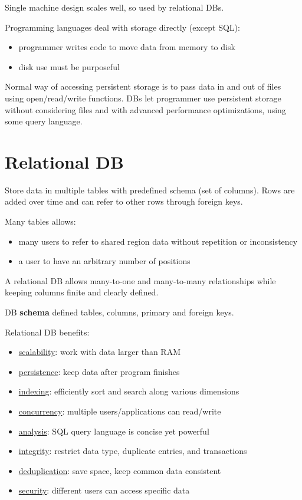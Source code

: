 \documentclass[11pt]{article}
\begin{document}
Single machine design scales well, so used by relational DBs.

Programming languages deal with storage directly (except SQL):
\begin{itemize}
\item programmer writes code to move data from memory to disk
\item disk use must be purposeful
\end{itemize}

Normal way of accessing persistent storage is to pass data in and out of files using open/read/write
functions.
DBs let programmer use persistent storage without considering files and with advanced performance
optimizations, using some query language.
\section{Relational DB}
\label{sec:orgc5113f4}
Store data in multiple tables with predefined schema (set of columns).
Rows are added over time and can refer to other rows through foreign keys.

Many tables allows:
\begin{itemize}
\item many users to refer to shared region data without repetition or inconsistency
\item a user to have an arbitrary number of positions
\end{itemize}

A relational DB allows many-to-one and many-to-many relationships while keeping columns finite and
clearly defined.

DB \textbf{schema} defined tables, columns, primary and foreign keys.

Relational DB benefits:
\begin{itemize}
\item \uline{scalability}: work with data larger than RAM
\item \uline{persistence}: keep data after program finishes
\item \uline{indexing}: efficiently sort and search along various dimensions
\item \uline{concurrency}: multiple users/applications can read/write
\item \uline{analysis}: SQL query language is concise yet powerful
\item \uline{integrity}: restrict data type, duplicate entries, and transactions
\item \uline{deduplication}: save space, keep common data consistent
\item \uline{security}: different users can access specific data
\end{itemize}
\end{document}
